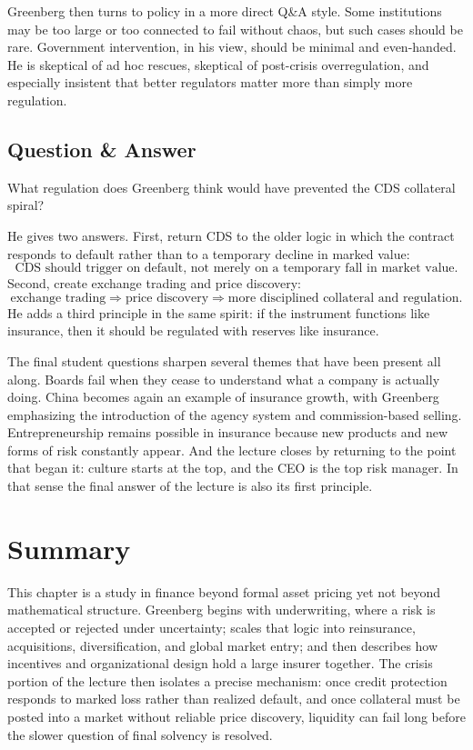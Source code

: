 Greenberg then turns to policy in a more direct Q\&A style. Some institutions may be too large or too connected to fail without chaos, but such cases should be rare. Government intervention, in his view, should be minimal and even-handed. He is skeptical of ad hoc rescues, skeptical of post-crisis overregulation, and especially insistent that better regulators matter more than simply more regulation.

\subsection{Question \& Answer}

What regulation does Greenberg think would have prevented the CDS collateral spiral?

He gives two answers. First, return CDS to the older logic in which the contract responds to default rather than to a temporary decline in marked value:
\begin{equation}
\text{CDS should trigger on default, not merely on a temporary fall in market value.}
\end{equation}
Second, create exchange trading and price discovery:
\begin{equation}
\text{exchange trading}
\Rightarrow
\text{price discovery}
\Rightarrow
\text{more disciplined collateral and regulation.}
\end{equation}
He adds a third principle in the same spirit: if the instrument functions like insurance, then it should be regulated with reserves like insurance.

The final student questions sharpen several themes that have been present all along. Boards fail when they cease to understand what a company is actually doing. China becomes again an example of insurance growth, with Greenberg emphasizing the introduction of the agency system and commission-based selling. Entrepreneurship remains possible in insurance because new products and new forms of risk constantly appear. And the lecture closes by returning to the point that began it: culture starts at the top, and the CEO is the top risk manager. In that sense the final answer of the lecture is also its first principle.

\section{Summary}

This chapter is a study in finance beyond formal asset pricing yet not beyond mathematical structure. Greenberg begins with underwriting, where a risk is accepted or rejected under uncertainty; scales that logic into reinsurance, acquisitions, diversification, and global market entry; and then describes how incentives and organizational design hold a large insurer together. The crisis portion of the lecture then isolates a precise mechanism: once credit protection responds to marked loss rather than realized default, and once collateral must be posted into a market without reliable price discovery, liquidity can fail long before the slower question of final solvency is resolved.

